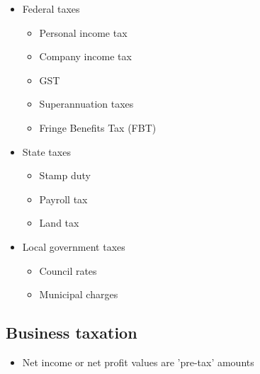 \documentclass{article}
\begin{document}
		\begin{itemize}
			\item Federal taxes
				\begin{itemize}
					\item Personal income tax
					\item Company income tax
					\item GST
					\item Superannuation taxes
					\item Fringe Benefits Tax (FBT)
				\end{itemize}
			\item State taxes
				\begin{itemize}
					\item Stamp duty
					\item Payroll tax
					\item Land tax
				\end{itemize}
			\item Local government taxes
				\begin{itemize}
					\item Council rates
					\item Municipal charges
				\end{itemize}
		\end{itemize}
	
	\subsection{Business taxation}
		\begin{itemize}
			\item Net income or net profit values are 'pre-tax' amounts
		\end{itemize}
\end{document}
